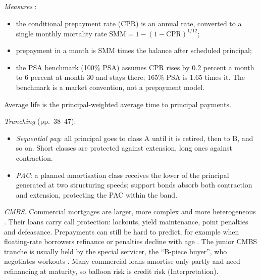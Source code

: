 \begin{qfmethod}
\emph{Measures} \citep[pp.~32--34]{fabozzi-kothari-securitisation-2008}:
\begin{itemize}
\item the conditional prepayment rate (CPR) is an annual rate, converted to a single monthly mortality rate $\mathrm{SMM}=1-(1-\mathrm{CPR})^{1/12}$;
\item prepayment in a month is SMM times the balance after scheduled principal;
\item the PSA benchmark (100\% PSA) assumes CPR rises by 0.2 percent a month to 6 percent at month 30 and stays there; 165\% PSA is 1.65 times it. The benchmark is a market convention, not a prepayment model.
\end{itemize}
Average life is the principal-weighted average time to principal payments.

\emph{Tranching} (pp.~38--47):
\begin{itemize}
\item \emph{Sequential pay}: all principal goes to class A until it is retired, then to B, and so on. Short classes are protected against extension, long ones against contraction.
\item \emph{PAC}: a planned amortisation class receives the lower of the principal generated at two structuring speeds; support bonds absorb both contraction and extension, protecting the PAC within the band.
\end{itemize}

\emph{CMBS.} Commercial mortgages are larger, more complex and more heterogeneous \citep[p.~2]{wide-fuster-mbs-review}. Their loans carry call protection: lockouts, yield maintenance, point penalties and defeasance. Prepayments can still be hard to predict, for example when floating-rate borrowers refinance or penalties decline with age \citep[pp.~1--2]{fhfa-ab-2021-02}. The junior CMBS tranche is usually held by the special servicer, the ``B-piece buyer'', who negotiates workouts \citep[p.~8]{wide-fuster-mbs-review}. Many commercial loans amortise only partly and need refinancing at maturity, so balloon risk is credit risk (Interpretation).


\end{qfmethod}
